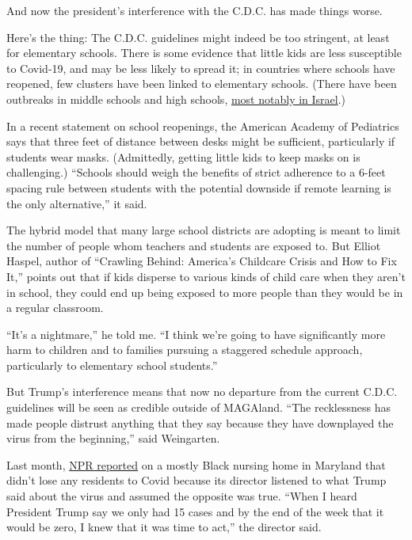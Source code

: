And now the president's interference with the C.D.C. has made things
worse.

Here's the thing: The C.D.C. guidelines might indeed be too stringent,
at least for elementary schools. There is some evidence that little kids
are less susceptible to Covid-19, and may be less likely to spread it;
in countries where schools have reopened, few clusters have been linked
to elementary schools. (There have been outbreaks in middle schools and
high schools,
\href{https://www.wsj.com/articles/israel-shuts-some-schools-as-coronavirus-cases-jump-after-reopening-11591203323}{most
notably in Israel}.)

In a recent statement on school reopenings, the American Academy of
Pediatrics says that three feet of distance between desks might be
sufficient, particularly if students wear masks. (Admittedly, getting
little kids to keep masks on is challenging.) ``Schools should weigh the
benefits of strict adherence to a 6-feet spacing rule between students
with the potential downside if remote learning is the only
alternative,'' it said.

The hybrid model that many large school districts are adopting is meant
to limit the number of people whom teachers and students are exposed to.
But Elliot Haspel, author of ``Crawling Behind: America's Childcare
Crisis and How to Fix It,'' points out that if kids disperse to various
kinds of child care when they aren't in school, they could end up being
exposed to more people than they would be in a regular classroom.

``It's a nightmare,'' he told me. ``I think we're going to have
significantly more harm to children and to families pursuing a staggered
schedule approach, particularly to elementary school students.''

But Trump's interference means that now no departure from the current
C.D.C. guidelines will be seen as credible outside of MAGAland. ``The
recklessness has made people distrust anything that they say because
they have downplayed the virus from the beginning,'' said Weingarten.

Last month,
\href{https://www.npr.org/2020/06/28/884351948/how-one-maryland-nursing-home-avoided-covid-19}{NPR
reported} on a mostly Black nursing home in Maryland that didn't lose
any residents to Covid because its director listened to what Trump said
about the virus and assumed the opposite was true. ``When I heard
President Trump say we only had 15 cases and by the end of the week that
it would be zero, I knew that it was time to act,'' the director said.


